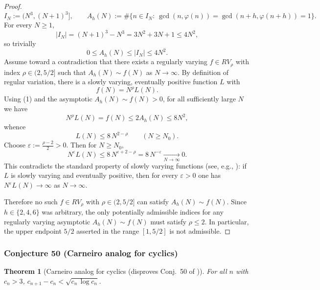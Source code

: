 \documentclass[12pt]{article}
\renewcommand{\tag}[1]{}
\newtheorem{theorem}{Theorem}
\theoremstyle{remark}
\begin{document}
\begin{proof}
$$
I_N:=(N^3,(N+1)^3],\qquad A_h(N):=\#\{n\in I_N:\ \gcd(n,\varphi(n))=\gcd(n+h,\varphi(n+h))=1\}.
$$
For every $N\ge 1$,
$$
|I_N|=(N+1)^3-N^3=3N^2+3N+1\le 4N^2,
$$
so trivially
$$
0\le A_h(N)\le |I_N|\le 4N^2. \tag{1}
$$
Assume toward a contradiction that there exists a regularly varying $f\in RV_\rho$ with index $\rho\in(2,5/2]$ such that $A_h(N)\sim f(N)$ as $N\to\infty$. By definition of regular variation, there is a slowly varying, eventually positive function $L$ with
$$
f(N)=N^{\rho}L(N). \tag{2}
$$
Using (1) and the asymptotic $A_h(N)\sim f(N)>0$, for all sufficiently large $N$ we have
$$
N^{\rho}L(N)=f(N)\le 2A_h(N)\le 8N^2,
$$
whence
$$
L(N)\le 8\,N^{2-\rho}\qquad(N\ge N_0). \tag{3}
$$
Choose $\varepsilon:=\tfrac{\rho-2}{2}>0$. Then for $N\ge N_0$,
$$
N^{\varepsilon}L(N)\le 8\,N^{\varepsilon+2-\rho}=8\,N^{-\varepsilon}\xrightarrow[N\to\infty]{}0. \tag{4}
$$
This contradicts the standard property of slowly varying functions (see, e.g., \cite{BGT1989}): if $L$ is slowly varying and eventually positive, then for every $\varepsilon>0$ one has $N^{\varepsilon}L(N)\to\infty$ as $N\to\infty$.

Therefore no such $f\in RV_\rho$ with $\rho\in(2,5/2]$ can satisfy $A_h(N)\sim f(N)$. Since $h\in\{2,4,6\}$ was arbitrary, the only potentially admissible indices for any regularly varying asymptotic $A_h(N)\sim f(N)$ must satisfy $\rho\le 2$. In particular, the upper endpoint $5/2$ asserted in the range $[1,5/2]$ is not admissible. 
\end{proof}




\subsubsection{Conjecture 50 (Carneiro analog for cyclics)}
\begin{theorem}[Carneiro analog for cyclics (disproves Conj.~50 of \cite{Cohen2025})]\label{thm:carneiro_cyclics}
For all $n$ with $c_n>3$, $c_{n+1}-c_n<\sqrt{c_n\,\log c_n}$.
\end{theorem}
\end{document}
